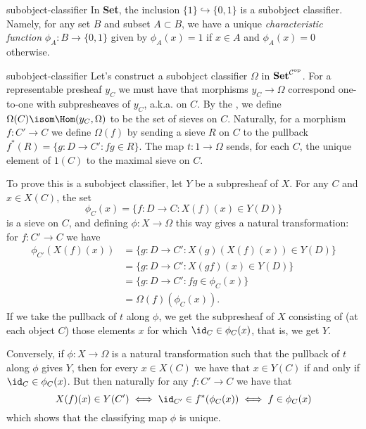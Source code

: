 \begin{example}{subobject-classifier}
    In \textbf{Set}, the inclusion $\{ 1 \} \hookrightarrow \{ 0, 1 \}$ is a subobject classifier. Namely, for any set $B$ and subset $A \subset B$, we have a unique \textit{characteristic function} $\phi_A : B \to \{ 0, 1 \}$ given by $\phi_A(x) = 1$ if $x \in A$ and $\phi_A(x) = 0$ otherwise.
\end{example}

\begin{example}{subobject-classifier}
    Let's construct a subobject classifier $\Omega$ in $\textbf{Set}^{\mathcal{C}^\textup{op}}$. For a representable presheaf $y_C$ we must have that morphisms $y_C \to \Omega$ correspond one-to-one with subpresheaves of $y_C$, a.k.a.  on $C$. By the , we define $\Omega(C) \isom \Hom(y_C, \Omega)$ to be the set of sieves on $C$. Naturally, for a morphism $f : C' \to C$ we define $\Omega(f)$ by sending a sieve $R$ on $C$ to the pullback $f^*(R) = \{ g : D \to C' : fg \in R \}$. The map $t : 1 \to \Omega$ sends, for each $C$, the unique element of $1(C)$ to the maximal sieve on $C$.
    
    To prove this is a subobject classifier, let $Y$ be a subpresheaf of $X$. For any $C$ and $x \in X(C)$, the set
    \[ \phi_C(x) = \{ f : D \to C : X(f)(x) \in Y(D) \} \]
    is a sieve on $C$, and defining $\phi : X \to \Omega$ this way gives a natural transformation: for $f : C' \to C$ we have
    \[ \begin{aligned}
        \phi_{C'}(X(f)(x))
            &= \{ g : D \to C' : X(g)(X(f)(x)) \in Y(D) \} \\
            &= \{ g : D \to C' : X(gf)(x) \in Y(D) \} \\
            &= \{ g : D \to C' : fg \in \phi_C(x) \} \\
            &= \Omega(f)(\phi_C(x)) .
    \end{aligned} \]
    If we take the pullback of $t$ along $\phi$, we get the subpresheaf of $X$ consisting of (at each object $C$) those elements $x$ for which $\id_C \in \phi_C(x)$, that is, we get $Y$.
    
    Conversely, if $\phi : X \to \Omega$ is a natural transformation such that the pullback of $t$ along $\phi$ gives $Y$, then for every $x \in X(C)$ we have that $x \in Y(C)$ if and only if $\id_C \in \phi_C(x)$. But then naturally for any $f : C' \to C$ we have that
    \[ X(f)(x) \in Y(C') \iff \id_{C'} \in f^*(\phi_C(x)) \iff f \in \phi_C(x) \]
    which shows that the classifying map $\phi$ is unique.
\end{example}

